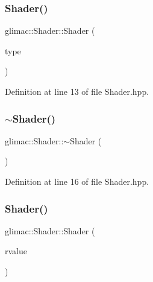 \subsubsection{\texorpdfstring{Shader()}{Shader()}\hspace{0.1cm}{\footnotesize\ttfamily [1/2]}}
{\footnotesize\ttfamily glimac\+::\+Shader\+::\+Shader (\begin{DoxyParamCaption}\item[{G\+Lenum}]{type }\end{DoxyParamCaption})\hspace{0.3cm}{\ttfamily [inline]}}



Definition at line 13 of file Shader.\+hpp.

\mbox{\label{classglimac_1_1_shader_ac36c2fedf8587caaf131ca164d737758}} 
\subsubsection{\texorpdfstring{$\sim$\+Shader()}{~Shader()}}
{\footnotesize\ttfamily glimac\+::\+Shader\+::$\sim$\+Shader (\begin{DoxyParamCaption}{ }\end{DoxyParamCaption})\hspace{0.3cm}{\ttfamily [inline]}}



Definition at line 16 of file Shader.\+hpp.

\mbox{\label{classglimac_1_1_shader_a98bf794b782f89a7a5c859607e6dc62b}} 
\subsubsection{\texorpdfstring{Shader()}{Shader()}\hspace{0.1cm}{\footnotesize\ttfamily [2/2]}}
{\footnotesize\ttfamily glimac\+::\+Shader\+::\+Shader (\begin{DoxyParamCaption}\item[{\hyperlink{classglimac_1_1_shader}{Shader} \&\&}]{rvalue }\end{DoxyParamCaption})\hspace{0.3cm}{\ttfamily [inline]}}



